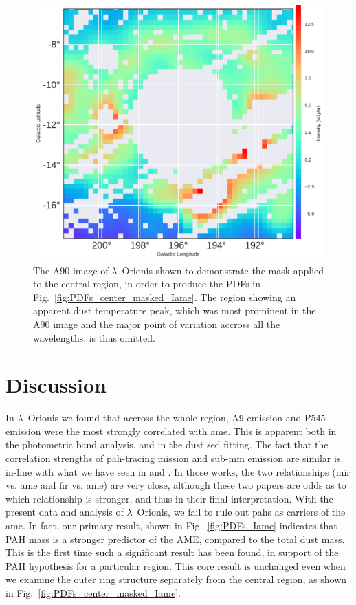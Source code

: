         \begin{figure}
          \includegraphics[width=\textwidth]{../Plots/ch_lori/lambda_orionis_center_mask.pdf}
          \centering
          \caption{ The A90 image of $\lambda$~Orionis shown to demonstrate the mask applied to the central region, in order to produce the PDFs in Fig.~\ref{fig:PDFs_center_masked_Iame}. The region showing an apparent dust temperature peak, which was most prominent in the A90 image and the major point of variation accross all the wavelengths, is thus omitted.}
          \label{fig:lambda_orionis_center_mask}
        \end{figure}

  \section{Discussion}
  \label{sec:lori_discussion}
      In  $\lambda$~Orionis we found that accross the whole region, A9 emission and P545 emission were the most strongly correlated with \gls{ame}. This is apparent both in the photometric band analysis, and in the dust \gls{sed} fitting.  The fact that the correlation strengths of \gls{pah}-tracing mission and sub-mm emission are similar is in-line with what we have seen in \cite{ysard10b} and \cite{hensley16}. In those works, the two relationships (\gls{mir} vs. \gls{ame} and \gls{fir} vs. \gls{ame}) are very close, although these two papers are odds as to which relationship is stronger, and thus in their final interpretation. With the present data and analysis of $\lambda$~Orionis, we fail to rule out \gls{pah}s as carriers of the \gls{ame}. In fact, our primary result, shown in Fig.~\ref{fig:PDFs_Iame} indicates that PAH mass is a stronger predictor of the AME, compared to the total dust mass. This is the first time such a significant result has been found, in support of the PAH hypothesis for a particular region. This core result is unchanged even when we examine the outer ring structure separately from the central region, as shown in Fig.~\ref{fig:PDFs_center_masked_Iame}.


